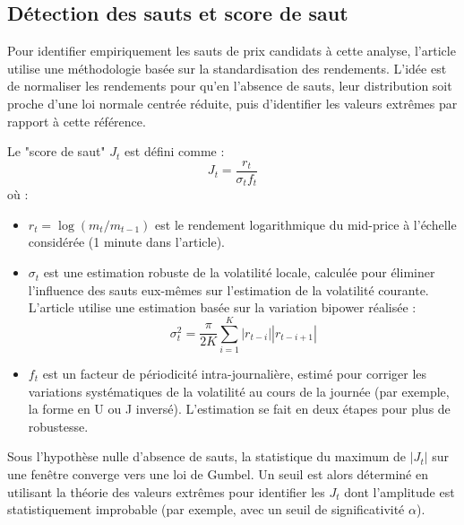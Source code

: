 \documentclass[10pt,a4paper]{article}
\theoremstyle{definition}
\theoremstyle{remark}
\begin{document}
\begin{itemize}
    \subsection{Détection des sauts et score de saut}

    Pour identifier empiriquement les sauts de prix candidats à cette analyse, l'article \cite{marcaccioli2021exogenous} utilise une méthodologie basée sur la standardisation des rendements. L'idée est de normaliser les rendements pour qu'en l'absence de sauts, leur distribution soit proche d'une loi normale centrée réduite, puis d'identifier les valeurs extrêmes par rapport à cette référence.

    Le "score de saut" $J_t$ est défini comme :
    \begin{equation}
    J_t = \frac{r_t}{\sigma_t f_t}
    \end{equation}
    où :
    \begin{itemize}
        \item $r_t = \log(m_t / m_{t-1})$ est le rendement logarithmique du mid-price à l'échelle considérée (1 minute dans l'article).
        \item $\sigma_t$ est une estimation robuste de la volatilité locale, calculée pour éliminer l'influence des sauts eux-mêmes sur l'estimation de la volatilité courante. L'article utilise une estimation basée sur la variation bipower réalisée :
        \[ \sigma^2_t = \frac{\pi}{2 K} \sum_{i=1}^{K} |r_{t-i}| |r_{t-i+1}| \]
        \item $f_t$ est un facteur de périodicité intra-journalière, estimé pour corriger les variations systématiques de la volatilité au cours de la journée (par exemple, la forme en U ou J inversé). L'estimation se fait en deux étapes pour plus de robustesse.
    \end{itemize}

    Sous l'hypothèse nulle d'absence de sauts, la statistique du maximum de $|J_t|$ sur une fenêtre converge vers une loi de Gumbel. Un seuil est alors déterminé en utilisant la théorie des valeurs extrêmes pour identifier les $J_t$ dont l'amplitude est statistiquement improbable (par exemple, avec un seuil de significativité $\alpha$).



\end{itemize}
\end{document}

